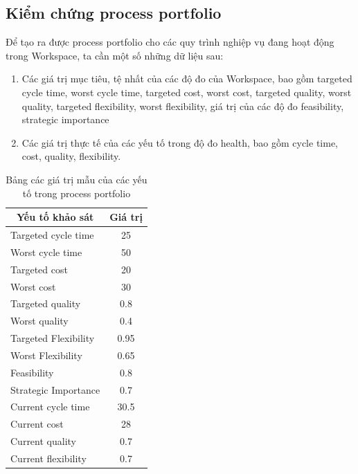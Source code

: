 \subsection{Kiểm chứng process portfolio}
Để tạo ra được process portfolio cho các quy trình nghiệp vụ đang hoạt động trong Workspace, ta cần một số những dữ liệu sau:
\begin{enumerate}
    \item Các giá trị mục tiêu, tệ nhất của các độ đo của Workspace, bao gồm targeted cycle time, worst cycle time, targeted cost, worst cost, 
    targeted quality, worst quality, targeted flexibility, worst flexibility, giá trị của các độ đo feasibility, strategic importance
    \item Các giá trị thực tế của các yếu tố trong độ đo health, bao gồm cycle time, cost, quality, flexibility.
\end{enumerate}
\begin{center}
    \begin{table}[H]
        \centering
        \begin{tabular}{|l|c|}
        \hline
        \multicolumn{1}{|c|}{\textbf{Yếu tố khảo sát}} & \textbf{Giá trị} \\ \hline
        Targeted cycle time & 25 \\ \hline
        Worst cycle time & 50 \\ \hline
        Targeted cost & 20 \\ \hline
        Worst cost & 30 \\ \hline
        Targeted quality & 0.8 \\ \hline
        Worst quality & 0.4 \\ \hline
        Targeted Flexibility & 0.95 \\ \hline
        Worst Flexibility & 0.65 \\ \hline
        Feasibility & 0.8 \\ \hline
        Strategic Importance & 0.7 \\ \hline
        Current cycle time & 30.5 \\ \hline
        Current cost & 28 \\ \hline
        Current quality & 0.7 \\ \hline
        Current flexibility & 0.7 \\ \hline
        \end{tabular}
        \vspace{0.5cm}
        \caption{Bảng các giá trị mẫu của các yếu tố trong process portfolio}
        \end{table}
\end{center}

